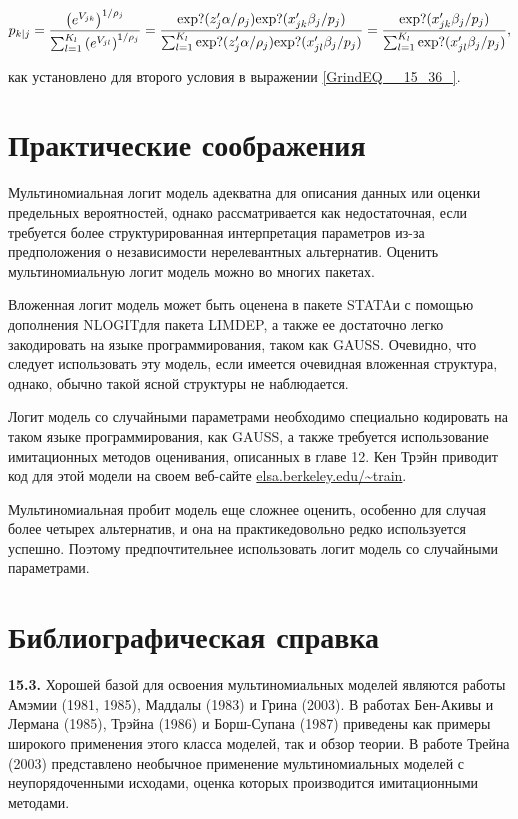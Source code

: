 \[p_{k|j}=\frac{{\left(e^{V_{jk}}\right)}^{{1}/{{\rho }_j}}}{\sum^{K_l}_{l=1}{{\left(e^{V_{jl}}\right)}^{{1}/{{\rho }_j}}}}=\frac{{\rm exp}?({z'_j\alpha }/{{\rho }_j}){\rm exp}?(x'_{jk}{\beta }_j/p_j)}{\sum^{K_l}_{l=1}{{\rm exp}?({z'_j\alpha }/{{\rho }_j}){\rm exp}?(x'_{jl}{\beta }_j/p_j)}}=\frac{{\rm exp}?(x'_{jk}{\beta }_j/p_j)}{\sum^{K_l}_{l=1}{{\rm exp}?(x'_{jl}{\beta }_j/p_j)}},\] 

как установлено для второго условия в выражении \eqref{GrindEQ__15_36_}.

\section{Практические соображения}

Мультиномиальная логит модель адекватна для описания данных или оценки предельных вероятностей, однако рассматривается как недостаточная, если требуется более структурированная интерпретация параметров из-за предположения о независимости нерелевантных альтернатив. Оценить мультиномиальную логит модель можно во многих пакетах.

Вложенная логит модель может быть оценена в пакете STATAи с помощью дополнения NLOGITдля пакета LIMDEP, а также ее достаточно легко закодировать на языке программирования, таком как GAUSS. Очевидно, что следует использовать эту модель, если имеется очевидная вложенная структура, однако, обычно такой ясной структуры не наблюдается.

Логит модель со случайными параметрами необходимо специально кодировать на таком языке программирования, как GAUSS, а также требуется использование имитационных методов оценивания, описанных в главе 12. Кен Трэйн приводит код для этой модели на своем веб-сайте \url{elsa.berkeley.edu/~train}.

Мультиномиальная пробит модель еще сложнее оценить, особенно для случая более четырех альтернатив, и она на практикедовольно редко используется успешно. Поэтому предпочтительнее использовать логит модель со случайными параметрами.

\section{Библиографическая справка}

\textbf{15.3. }Хорошей базой для освоения мультиномиальных моделей являются работы Амэмии (1981, 1985), Маддалы (1983) и Грина (2003). В работах Бен-Акивы и Лермана (1985), Трэйна (1986) и Борш-Супана (1987) приведены как примеры широкого применения этого класса моделей, так и обзор теории. В работе Трейна (2003) представлено необычное применение мультиномиальных моделей с неупорядоченными исходами, оценка которых производится имитационными методами.

